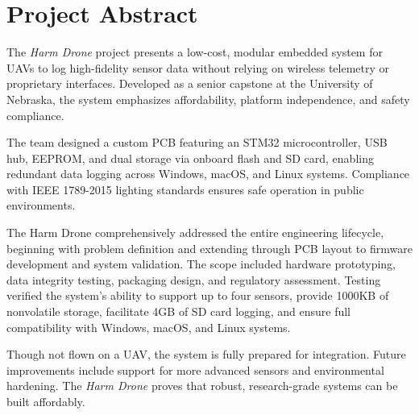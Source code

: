 \documentclass[../main.tex]{subfiles}
\begin{document}
\section*{Project Abstract}

\par The \textit{Harm Drone} project presents a low-cost, modular embedded system for UAVs to log high-fidelity sensor data without relying on wireless telemetry or proprietary interfaces. Developed as a senior capstone at the University of Nebraska, the system emphasizes affordability, platform independence, and safety compliance.

\par The team designed a custom PCB featuring an STM32 microcontroller, USB hub, EEPROM, and dual storage via onboard flash and SD card, enabling redundant data logging across Windows, macOS, and Linux systems. Compliance with IEEE 1789-2015 lighting standards ensures safe operation in public environments.

\par The Harm Drone comprehensively addressed the entire engineering lifecycle, beginning with problem definition and extending through PCB layout to firmware development and system validation. The scope included hardware prototyping, data integrity testing, packaging design, and regulatory assessment. Testing verified the system's ability to support up to four sensors, provide 1000KB of nonvolatile storage, facilitate 4GB of SD card logging, and ensure full compatibility with Windows, macOS, and Linux systems.

\par Though not flown on a UAV, the system is fully prepared for integration. Future improvements include support for more advanced sensors and environmental hardening. The \textit{Harm Drone} proves that robust, research-grade systems can be built affordably.
\end{document}
